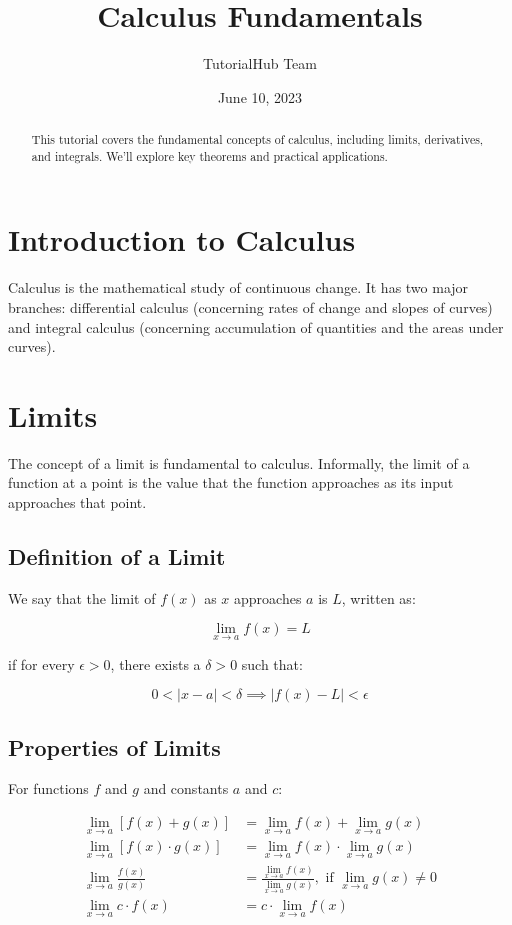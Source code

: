 \documentclass{article}
\title{Calculus Fundamentals}
\author{TutorialHub Team}
\date{June 10, 2023}
\begin{document}
\maketitle

\begin{abstract}
This tutorial covers the fundamental concepts of calculus, including limits, derivatives, and integrals. We'll explore key theorems and practical applications.
\end{abstract}

\section{Introduction to Calculus}

Calculus is the mathematical study of continuous change. It has two major branches: differential calculus (concerning rates of change and slopes of curves) and integral calculus (concerning accumulation of quantities and the areas under curves).

\section{Limits}

The concept of a limit is fundamental to calculus. Informally, the limit of a function at a point is the value that the function approaches as its input approaches that point.

\subsection{Definition of a Limit}

We say that the limit of $f(x)$ as $x$ approaches $a$ is $L$, written as:

$$\lim_{x \to a} f(x) = L$$

if for every $\epsilon > 0$, there exists a $\delta > 0$ such that:

$$0 < |x - a| < \delta \implies |f(x) - L| < \epsilon$$

\subsection{Properties of Limits}

For functions $f$ and $g$ and constants $a$ and $c$:

\begin{align}
\lim_{x \to a} [f(x) + g(x)] &= \lim_{x \to a} f(x) + \lim_{x \to a} g(x) \\
\lim_{x \to a} [f(x) \cdot g(x)] &= \lim_{x \to a} f(x) \cdot \lim_{x \to a} g(x) \\
\lim_{x \to a} \frac{f(x)}{g(x)} &= \frac{\lim_{x \to a} f(x)}{\lim_{x \to a} g(x)}, \text{ if } \lim_{x \to a} g(x) \neq 0 \\
\lim_{x \to a} c \cdot f(x) &= c \cdot \lim_{x \to a} f(x)
\end{align}
\end{document}
